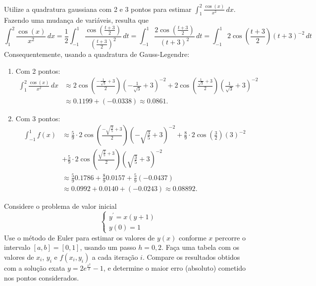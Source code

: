 \documentclass[12pt,a4paper]{article}
\begin{document}
\begin{ExerciseList}
\Exercise[title={2,5}] Utilize a quadratura gaussiana com 2 e 3 pontos para estimar $\int_1^2 \frac{\cos(x)}{x^2} \,dx$.
\Answer Fazendo uma mudança de variáveis, resulta que
\[
  \int_1^2 \frac{\cos(x)}{x^2} \,dx
= \frac{1}{2} \int_{-1}^1
 \frac
 { \cos\left( \frac{t + 3}{2} \right) }
 { \left(  \frac{t + 3}{2} \right)^2 }
 \,dt
= \int_{-1}^1
 \frac
 { 2 \cos\left( \frac{t + 3}{2} \right) }
 { \left( t + 3 \right)^2 }
 \,dt
= \int_{-1}^1
 2 \cos\left( \frac{t + 3}{2} \right)
 \left( t + 3 \right)^{-2}
 \,dt
\]
Consequentemente, usando a quadratura de Gauss-Legendre:
\begin{enumerate}
\item Com 2 pontos:
\begin{align*}
\int_1^2 \frac{\cos(x)}{x^2} \,dx
& \approx
 2\cos\left(  \frac{-\frac{1}{\sqrt{3}} + 3}{2}  \right)
 \left( -\frac{1}{\sqrt{3}} + 3 \right)^{-2}
+
 2\cos\left(  \frac{\frac{1}{\sqrt{3}} + 3}{2}  \right)
 \left( \frac{1}{\sqrt{3}} + 3 \right)^{-2} \\
& \approx
 0.1199 + (-0.0338) \approx 0.0861.
\end{align*}

\item Com 3 pontos:
\begin{align*}
\int_{-1}^1 f(x)
& \approx
\frac{5}{9}\cdot
 2\cos\left( \frac{-\sqrt{\frac{3}{5}} + 3}{2} \right)
 \left( -\sqrt{\frac{3}{5}} + 3 \right)^{-2}
+
\frac{8}{9}\cdot
 2\cos\left( \frac{3}{2} \right)
 \left(3 \right)^{-2} \\
& +
\frac{5}{9}\cdot
 2\cos\left( \frac{\sqrt{\frac{3}{5}} + 3}{2} \right)
 \left( \sqrt{\frac{3}{5}} + 3 \right)^{-2} \\
& \approx
\frac{5}{9} 0.1786 +
\frac{8}{9} 0.0157 +
\frac{5}{9} (-0.0437) \\
& \approx
  0.0992 +
  0.0140 +
(-0.0243)
  \approx
0.08892.
\end{align*}
\end{enumerate}

\Exercise[title={2,5}] Considere o problema de valor inicial
\[
\begin{cases}
y^\prime = x (y + 1) \\
y(0) = 1
\end{cases}
\]
Use o método de Euler para estimar os valores de $y(x)$ conforme $x$ percorre o intervalo $[a,b] = [0, 1]$, usando um passo $h = 0,2$. Faça uma tabela com os valores de $x_i$, $y_i$ e $f(x_i, y_i)$ a cada iteração $i$. Compare os resultados obtidos com a solução exata $y= 2e^{\frac{x^2}{2}}-1$, e determine o maior erro (absoluto) cometido nos pontos considerados.


\end{ExerciseList}
\end{document}
